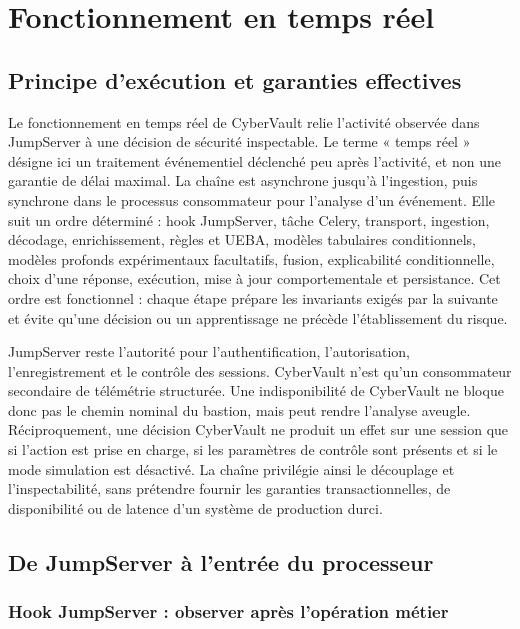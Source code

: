 \documentclass[11pt,a4paper,oneside]{report}
\theoremstyle{definition}
\theoremstyle{plain}
\begin{document}
\chapter{Fonctionnement en temps réel}
\label{chap:realtime}

\section{Principe d'exécution et garanties effectives}

Le fonctionnement en temps réel de CyberVault relie l'activité observée dans
JumpServer à une décision de sécurité inspectable. Le terme « temps réel »
désigne ici un traitement événementiel déclenché peu après l'activité, et non
une garantie de délai maximal. La chaîne est asynchrone jusqu'à l'ingestion,
puis synchrone dans le processus consommateur pour l'analyse d'un événement.
Elle suit un ordre déterminé : hook JumpServer, tâche Celery, transport,
ingestion, décodage, enrichissement, règles et UEBA, modèles tabulaires
conditionnels, modèles profonds expérimentaux facultatifs, fusion,
explicabilité conditionnelle, choix d'une réponse, exécution, mise à jour
comportementale et persistance. Cet ordre est fonctionnel : chaque étape
prépare les invariants exigés par la suivante et évite qu'une décision ou un
apprentissage ne précède l'établissement du risque.

JumpServer reste l'autorité pour l'authentification, l'autorisation,
l'enregistrement et le contrôle des sessions. CyberVault n'est qu'un
consommateur secondaire de télémétrie structurée. Une indisponibilité de
CyberVault ne bloque donc pas le chemin nominal du bastion, mais peut rendre
l'analyse aveugle. Réciproquement, une décision CyberVault ne produit un effet
sur une session que si l'action est prise en charge, si les paramètres de
contrôle sont présents et si le mode simulation est désactivé. La chaîne
privilégie ainsi le découplage et l'inspectabilité, sans prétendre fournir les
garanties transactionnelles, de disponibilité ou de latence d'un système de
production durci.

\section{De JumpServer à l'entrée du processeur}

\subsection{Hook JumpServer : observer après l'opération métier}
\end{document}
